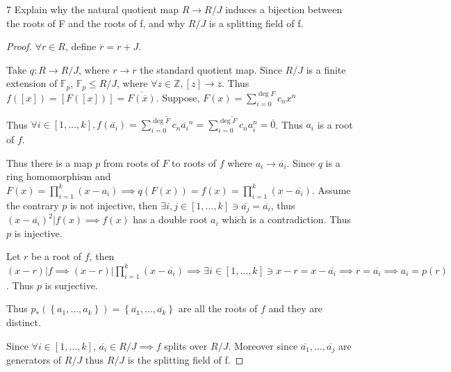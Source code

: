 \documentclass{article}
\newcommand{\Z}{\mathbb{Z}}
\newcommand{\F}{\mathbb{F}}
\begin{document}
\begin{PROB}{7}\label{Problem 7.}
    Explain why the natural quotient map $R \to R/J$  induces a bijection between the roots of F and the roots of f, and why $R/J$ is a splitting field of f.
\end{PROB}
\begin{proof}
    $\forall r \in R$, define $\overline{r} = r + J$.  

    Take $q: R \to R / J$, where $r \to \overline{r}$ the standard quotient map. Since $R / J$ is a finite extension of $\F_p$, $\F_p \leq R / J$, where $\forall z \in \Z, [z] \to \overline{z}$. 
    Thus $f([x]) = [F([x])] = \overline{F(\overline{x})}$. Suppose, $F(x) = \sum_{i = 0}^{\deg F} c_n x^n$  
    
    Thus $\forall i \in [1, \dots, k], f(\bar{a_i}) = \overline{\sum_{i = 0}^{\deg F} c_n \overline{a_i}^n} = \overline{\sum_{i = 0}^{\deg F} c_n a_i^n} = \overline{0}$. Thus $a_i$ is a root of $f$. 
    
    Thus there is a map $p$ from roots of $F$ to roots of $f$ where $a_i \to \overline{a_i}$. Since $q$ is a ring homomorphism and $F(x) = \prod_{i = 1}^{k}(x - a_i) \implies q(F(x)) = f(x) = \prod_{i = 1}^{k}(x - \overline{a_i})$. Assume the contrary $p$ is not injective, then $\exists i, j \in [1, \dots, k] \ni \overline{a_j} = \overline{a_i}$, thus $(x - \overline{a_i})^2 | f(x) \implies f(x)$ has a double root $a_i$ which is a contradiction. Thus $p$ is injective.

    Let $r$ be a root of $f$, then $(x - r) | f \implies (x - r) | \prod_{i = 1}^{k}(x - \overline{a_i}) \implies \exists i \in [1, \dots, k] \ni x - r = x - \overline{a_i} \implies r = \overline{a_i} \implies a_i = p(r)$. Thus $p$ is surjective. 

    Thus $p_*(\left\{ a_1, \dots, a_k \right\}) = \left\{ \overline{a_1}, \dots, \overline{a_k} \right\}$ are all the roots of $f$ and they are distinct.     

    Since $\forall i \in [1, \dots, k]$, $\overline{a_i} \in R / J \implies f$ splits over $R / J$. Moreover since $\overline{a_1}, \dots, \overline{a_j}$ are generators of $R / J$ thus $R / J$ is the splitting field of f. 
\end{proof}

\bigskip
\end{document}
